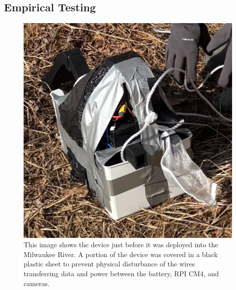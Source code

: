 \documentclass[fleqn,10pt]{SelfArx} %
\begin{document}
	\subsection{Empirical Testing}
	\begin{figure}[h]
		\centering
		\includegraphics[width=1\linewidth]{Figures/DevicePrep}
		\caption[Preparing Device for Deployment]{This image shows the device just before it was deployed into the Milwaukee River. A portion of the device was covered in a black plastic sheet to prevent physical disturbance of the wires transferring data and power between the battery, RPI CM4, and cameras.}
		\label{fig:DevicePrep}
	\end{figure}
	
\end{document}
